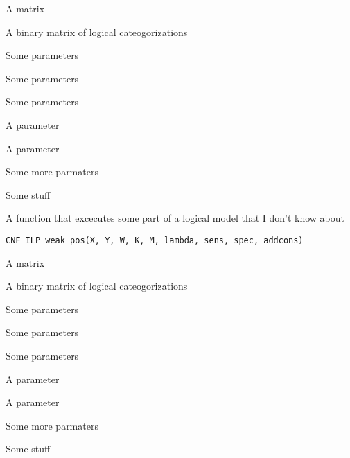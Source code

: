 \documentclass[letterpaper]{book}
\begin{document}
\begin{Arguments}
\begin{ldescription}
\item[\code{X}] A matrix

\item[\code{Y}] A binary matrix of logical cateogorizations

\item[\code{W}] Some parameters

\item[\code{K}] Some parameters

\item[\code{M}] Some parameters

\item[\code{lambda}] A parameter

\item[\code{sens}] A parameter

\item[\code{spec}] Some more parmaters

\item[\code{addcons}] Some stuff
\end{ldescription}
\end{Arguments}
%
\begin{Description}\relax
A function that excecutes some part of a logical model that I don't know about
\end{Description}
%
\begin{Usage}
\begin{verbatim}
CNF_ILP_weak_pos(X, Y, W, K, M, lambda, sens, spec, addcons)
\end{verbatim}
\end{Usage}
%
\begin{Arguments}
\begin{ldescription}
\item[\code{X}] A matrix

\item[\code{Y}] A binary matrix of logical cateogorizations

\item[\code{W}] Some parameters

\item[\code{K}] Some parameters

\item[\code{M}] Some parameters

\item[\code{lambda}] A parameter

\item[\code{sens}] A parameter

\item[\code{spec}] Some more parmaters

\item[\code{addcons}] Some stuff
\end{ldescription}
\end{Arguments}
\end{document}

